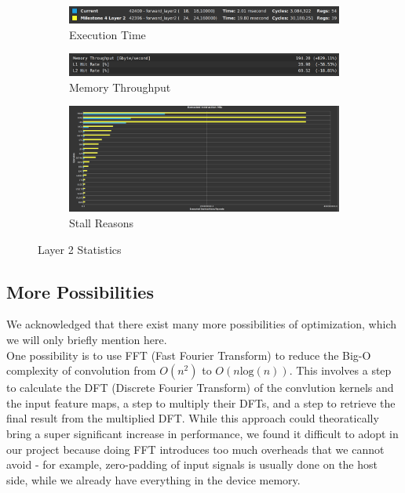 \documentclass{article}
\begin{document}
\begin{figure}[H]
    \centering
    \begin{subfigure}[b]{\linewidth}
        \includegraphics[width=\linewidth]{final_layer2_summary}
        \caption{Execution Time}
    \end{subfigure}
    \begin{subfigure}[b]{\linewidth}
        \includegraphics[width=\linewidth]{final_layer2_mem}
        \caption{Memory Throughput}
    \end{subfigure}
    \begin{subfigure}[b]{\linewidth}
        \includegraphics[width=\linewidth]{final_layer2_opcode}
        \caption{Stall Reasons}
    \end{subfigure}
    \caption{Layer 2 Statistics}
\end{figure}

\subsection{More Possibilities}
We acknowledged that there exist many more possibilities of optimization, which we
will only briefly mention here. \\

One possibility is to use FFT (Fast Fourier
Transform) to reduce the Big-O complexity of convolution from $O(n^2)$ to $O(n\text{log}(n))$.
This involves a step to calculate the DFT (Discrete Fourier Transform) of the
convlution kernels and the input feature maps, a step to multiply their DFTs,
and a step to retrieve the final result from the multiplied DFT. While this approach
could theoratically bring a super significant increase in performance, we found it
difficult to adopt in our project because doing FFT introduces too much overheads
that we cannot avoid - for example, zero-padding of input signals is usually done
on the host side, while we already have everything in the device memory. \\
\end{document}
